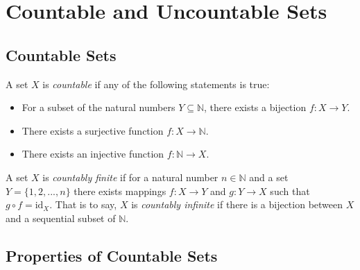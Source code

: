 \documentclass[10pt, letterpaper]{article}
\begin{document}



\pagebreak


\section{Countable and Uncountable Sets}

\subsection{Countable Sets}

\begin{definition}
A set $X$ is \textit{countable} if any of the following statements is true:

\begin{itemize}
  \item For a subset of the natural numbers $Y \subseteq \mathbb{N}$, there exists a bijection $f : X \to Y$.
  \item There exists a surjective function $f : X \to \mathbb{N}$.
  \item There exists an injective function $f : \mathbb{N} \to X$.
\end{itemize}
\end{definition}

\begin{definition}
A set $X$ is \textit{countably finite} if for a natural number $n \in \mathbb{N}$ and a set $Y = \{1, 2, ..., n\}$ there
exists mappings $f : X \to Y$ and $g : Y \to X$ such that $g \circ f = \text{id}_X$. That is to say, $X$ is
\textit{countably infinite} if there is a bijection between $X$ and a sequential subset of $\mathbb{N}$.
\end{definition}

\subsection{Properties of Countable Sets}
\end{document}
